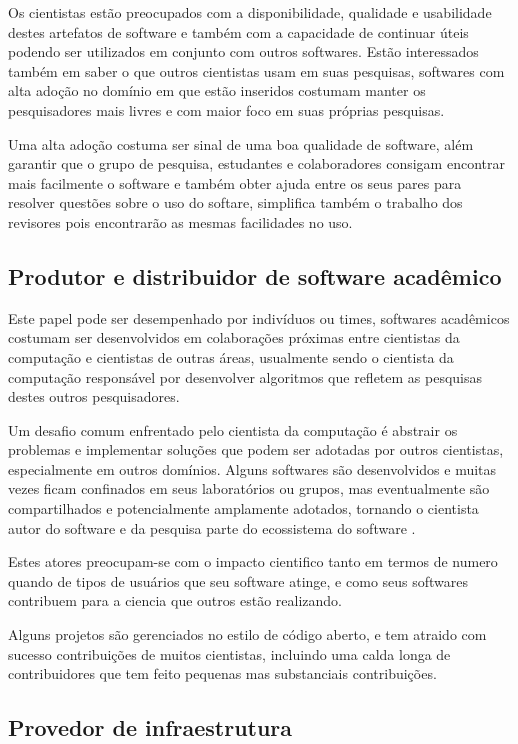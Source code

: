 Os cientistas estão preocupados com a disponibilidade, qualidade e usabilidade
destes artefatos de software e também com a capacidade de continuar úteis
podendo ser utilizados em conjunto com outros softwares. Estão interessados
também em saber o que outros cientistas usam em suas pesquisas, softwares com
alta adoção no domínio em que estão inseridos costumam manter os pesquisadores
mais livres e com maior foco em suas próprias pesquisas.

Uma alta adoção costuma ser sinal de uma boa qualidade de software, além
garantir que o grupo de pesquisa, estudantes e colaboradores consigam encontrar
mais facilmente o software e também obter ajuda entre os seus pares para
resolver questões sobre o uso do softare, simplifica também o trabalho dos
revisores pois encontrarão as mesmas facilidades no uso.

\subsection{Produtor e distribuidor de software acadêmico}

Este papel pode ser desempenhado por indivíduos ou times, softwares acadêmicos
costumam ser desenvolvidos em colaborações próximas entre cientistas da
computação e cientistas de outras áreas, usualmente sendo o cientista da
computação responsável por desenvolver algoritmos que refletem as pesquisas
destes outros pesquisadores.

Um desafio comum enfrentado pelo cientista da computação é abstrair os
problemas e implementar soluções que podem ser adotadas por outros cientistas,
especialmente em outros domínios. Alguns softwares são desenvolvidos e muitas
vezes ficam confinados em seus laboratórios ou grupos, mas eventualmente são
compartilhados e potencialmente amplamente adotados, tornando o cientista autor
do software e da pesquisa parte do ecossistema do software
\cite{howison2015understanding}.

Estes atores preocupam-se com o impacto cientifico tanto em termos de numero
quando de tipos de usuários que seu software atinge, e como seus softwares
contribuem para a ciencia que outros estão realizando.

Alguns projetos são gerenciados no estilo de código aberto, e tem atraido com
sucesso contribuições de muitos cientistas, incluindo uma calda longa de
contribuidores que tem feito pequenas mas substanciais contribuições.

\subsection{Provedor de infraestrutura}

